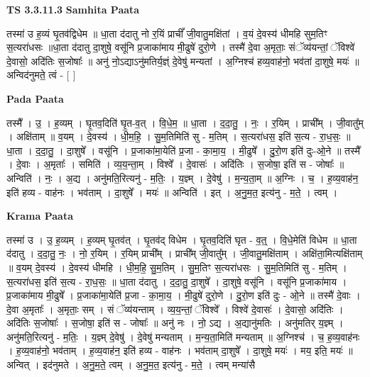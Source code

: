 \documentclass[17pt]{extarticle}
\begin{document}
\textbf{TS 3.3.11.3 } \newline
\textbf{Samhita Paata} \newline

तस्मा॑ उ ह॒व्यं घृ॒तव॑द्विधेम ॥ धा॒ता द॑दातु नो र॒यिं प्राचीं᳚ जी॒वातु॒मक्षि॑तां । व॒यं दे॒वस्य॑ धीमहि सुम॒तिꣳ स॒त्यरा॑धसः ॥धा॒ता द॑दातु दा॒शुषे॒ वसू॑नि प्र॒जाका॑माय मी॒ढुषे॑ दुरो॒णे । तस्मै॑ दे॒वा अ॒मृताः॒ संॅव्य॑यन्तां॒ ॅविश्वे॑ दे॒वासो॒ अदि॑तिः स॒जोषाः᳚ ॥ अनु॑ नो॒ऽद्याऽनु॑मतिर्य॒ज्ञ्ं दे॒वेषु॑ मन्यतां । अ॒ग्निश्च॑ हव्य॒वाह॑नो॒ भव॑तां दा॒शुषे॒ मयः॑ ॥ अन्विद॑नुमते॒ त्वं - [  ] \newline

\textbf{Pada Paata} \newline

तस्मै᳚ । उ॒ । ह॒व्यम् । घृ॒तव॒दिति॑ घृ॒त-व॒त् । वि॒धे॒म॒ ॥ धा॒ता । द॒दा॒तु॒ । नः॒ । र॒यिम् । प्राची᳚म् । जी॒वातु᳚म् । अक्षि॑ताम् ॥ व॒यम् । दे॒वस्य॑ । धी॒म॒हि॒ । सु॒म॒तिमिति॑ सु - म॒तिम् । स॒त्यरा॑धस॒ इति॑ स॒त्य - रा॒ध॒सः॒ ॥ धा॒ता । द॒दा॒तु॒ । दा॒शुषे᳚ । वसू॑नि । प्र॒जाका॑मा॒येति॑ प्र॒जा - का॒मा॒य॒ । मी॒ढुषे᳚ । दु॒रो॒ण इति॑ दुः-ओ॒ने ॥ तस्मै᳚ । दे॒वाः । अ॒मृताः᳚ । समिति॑ । व्य॒य॒न्ता॒म् । विश्वे᳚ । दे॒वासः॑ । अदि॑तिः । स॒जोषा॒ इति॑ स - जोषाः᳚ ॥ अन्विति॑ । नः॒ । अ॒द्य । अनु॑मति॒रित्यनु॑ - म॒तिः॒ । य॒ज्ञ्म् । दे॒वेषु॑ । म॒न्य॒ता॒म् ॥ अ॒ग्निः । च॒ । ह॒व्य॒वाह॑न॒ इति॑ हव्य - वाह॑नः । भव॑ताम् । दा॒शुषे᳚ । मयः॑ ॥ अन्विति॑ । इत् । अ॒नु॒म॒त॒ इत्य॑नु - म॒ते॒ । त्वम् ।  \newline


\textbf{Krama Paata} \newline

तस्मा॑ उ । उ॒ ह॒व्यम् । ह॒व्यम् घृ॒तव॑त् । घृ॒तव॑द् विधेम । घृ॒तव॒दिति॑ घृत - व॒त्॒ । वि॒धे॒मेति॑ विधेम ॥ धा॒ता द॑दातु । द॒दा॒तु॒ नः॒ । नो॒ र॒यिम् । र॒यिम् प्राची᳚म् । प्राची᳚म् जी॒वातु᳚म् । जी॒वातु॒मक्षि॑ताम् । अक्षि॑ता॒मित्यक्षि॑ताम् ॥ व॒यम् दे॒वस्य॑ । दे॒वस्य॑ धीमहि । धी॒म॒हि॒ सु॒म॒तिम् । सु॒म॒तिꣳ स॒त्यरा॑धसः । सु॒म॒तिमिति॑ सु - म॒तिम् । स॒त्यरा॑धस॒ इति॑ स॒त्य - रा॒ध॒सः॒ ॥ धा॒ता द॑दातु । द॒दा॒तु॒ दा॒शुषे᳚ । दा॒शुषे॒ वसू॑नि । वसू॑नि प्र॒जाका॑माय । प्र॒जाका॑माय मी॒ढुषे᳚ । प्र॒जाका॑मा॒येति॑ प्र॒जा - का॒मा॒य॒ । मी॒ढुषे॑ दुरो॒णे । दु॒रो॒ण इति॑ दुः - ओ॒ने ॥ तस्मै॑ दे॒वाः । दे॒वा अ॒मृताः᳚ । अ॒मृताः॒ सम् । सं ॅव्य॑यन्ताम् । व्य॒य॒न्तां॒ ॅविश्वे᳚ । विश्वे॑ दे॒वासः॑ । दे॒वासो॒ अदि॑तिः । अदि॑तिः स॒जोषाः᳚ । स॒जोषा॒ इति॑ स - जोषाः᳚ ॥ अनु॑ नः । नो॒ ऽद्य । अ॒द्यानु॑मतिः । अनु॑मतिर् य॒ज्ञ्म् । अनु॑मति॒रित्यनु॑ - म॒तिः॒ । य॒ज्ञ्म् दे॒वेषु॑ । दे॒वेषु॑ मन्यताम् । म॒न्य॒ता॒मिति॑ मन्यताम् ॥ अ॒ग्निश्च॑ । च॒ ह॒व्य॒वाह॑नः । ह॒व्य॒वाह॑नो॒ भव॑ताम् । ह॒व्य॒वाह॑न॒ इति॑ हव्य - वाह॑नः । भव॑ताम् दा॒शुषे᳚ । दा॒शुषे॒ मयः॑ । मय॒ इति॒ मयः॑ ॥ अन्वित् । इद॑नुमते । अ॒नु॒म॒ते॒ त्वम् । अ॒नु॒म॒त॒ इत्य॑नु - म॒ते॒ । त्वम् मन्या॑सै \newline
\end{document}
